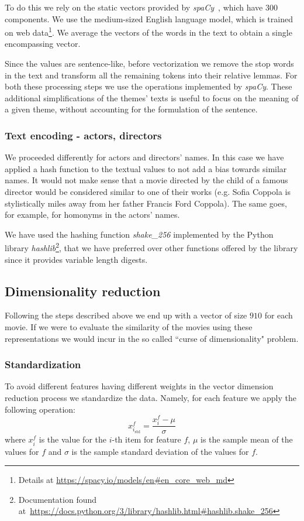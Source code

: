 To do this we rely on the static vectors provided by \textit{spaCy}~\cite{Montani2023SpaCy}, which have $300$ components. We use the medium-sized English language model, which is trained on web data\footnote{Details at \url{https://spacy.io/models/en\#en_core_web_md}}. We average the vectors of the words in the text to obtain a single encompassing vector.

Since the  values are sentence-like, before vectorization we remove the stop words in the text and transform all the remaining tokens into their relative lemmas. For both these processing steps we use the operations implemented by \textit{spaCy}. These additional simplifications of the themes' texts is useful to focus on the meaning of a given theme, without accounting for the formulation of the sentence.

\subsubsection{Text encoding - actors, directors}
We proceeded differently for actors and directors' names. In this case we have applied a hash function to the textual values to not add a bias towards similar names. It would not make sense that a movie directed by the child of a famous director would be considered similar to one of their works (e.g. Sofia Coppola is stylistically miles away from her father Francis Ford Coppola). The same goes, for example, for homonyms in the actors' names.

We have used the hashing function \textit{shake\_256} implemented by the Python library \textit{hashlib}\footnote{Documentation found at~\url{https://docs.python.org/3/library/hashlib.html\#hashlib.shake\_256}}, that we have preferred over other functions offered by the library since it provides variable length digests.

\subsection{Dimensionality reduction}
Following the steps described above we end up with a vector of size $910$ for each movie. If we were to evaluate the similarity of the movies using these representations we would incur in the so called ``curse of dimensionality" problem. 

\subsubsection{Standardization}
To avoid different features having different weights in the vector dimension reduction process we standardize the data. Namely, for each feature we apply the following operation:
\begin{equation}
    {x^f_{i_{\text{std}}}}=\frac{x^f_i-\mu}{\sigma}
\end{equation}
where $x^f_i$ is the value for the $i$-th item for feature $f$, $\mu$ is the sample mean of the values for $f$ and $\sigma$ is the sample standard deviation of the values for $f$.

